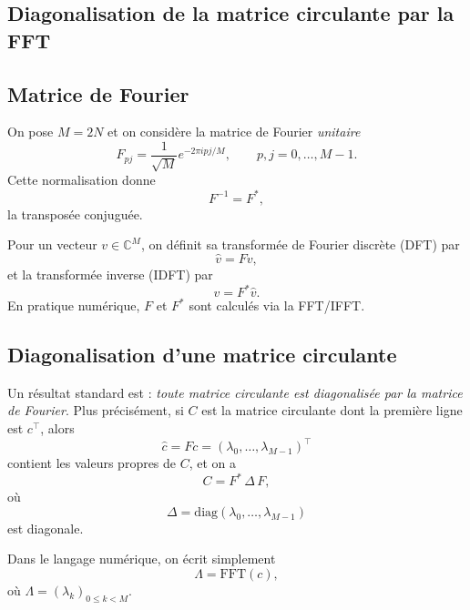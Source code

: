 \documentclass[11pt,a4paper]{article}
\newcommand{\C}{\mathbb{C}}
\newcommand{\1}{\mathbf{1}}
\begin{document}
\subsection{Diagonalisation de la matrice circulante par la FFT}

\subsection{Matrice de Fourier}

On pose $M=2N$ et on considère la matrice de Fourier \emph{unitaire}
\begin{equation}
  F_{pj} = \frac{1}{\sqrt{M}} e^{-2\pi i pj/M},
  \qquad p,j = 0,\dots,M-1.
\end{equation}
Cette normalisation donne
\[
  F^{-1} = F^\ast,
\]
la transposée conjuguée.

Pour un vecteur $v\in\C^M$, on définit sa transformée de Fourier discrète
(DFT) par
\begin{equation}
  \widehat v = F v,
\end{equation}
et la transformée inverse (IDFT) par
\begin{equation}
  v = F^\ast \widehat v.
\end{equation}
En pratique numérique, $F$ et $F^\ast$ sont calculés via la FFT/IFFT.

\subsection{Diagonalisation d'une matrice circulante}

Un résultat standard est : \emph{toute matrice circulante est diagonalisée
par la matrice de Fourier}.
Plus précisément, si $C$ est la matrice circulante dont la première ligne
est $c^\top$, alors
\begin{equation}
  \widehat c = F c
  = (\lambda_0,\dots,\lambda_{M-1})^\top
\end{equation}
contient les valeurs propres de $C$, et on a
\begin{equation}
  \boxed{
  C = F^\ast \,\Delta\, F,
  }
\end{equation}
où
\begin{equation}
  \Delta = \mathrm{diag}(\lambda_0,\dots,\lambda_{M-1})
\end{equation}
est diagonale.

Dans le langage numérique, on écrit simplement
\[
  \Lambda = \mathrm{FFT}(c),
\]
où $\Lambda=(\lambda_k)_{0\le k<M}$.
\end{document}
